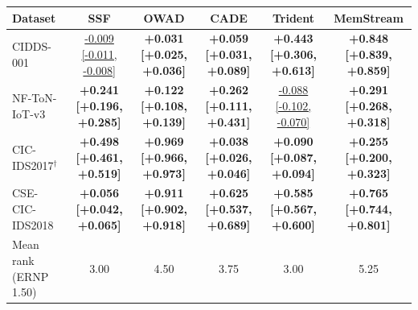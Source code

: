 \begin{tabular}{lccccc}
\toprule
Dataset & SSF & OWAD & CADE & Trident & MemStream\\
\midrule
CIDDS-001 & \underline{-0.009 [-0.011, -0.008]} & \textbf{+0.031 [+0.025, +0.036]} & \textbf{+0.059 [+0.031, +0.089]} & \textbf{+0.443 [+0.306, +0.613]} & \textbf{+0.848 [+0.839, +0.859]}\\
NF-ToN-IoT-v3 & \textbf{+0.241 [+0.196, +0.285]} & \textbf{+0.122 [+0.108, +0.139]} & \textbf{+0.262 [+0.111, +0.431]} & \underline{-0.088 [-0.102, -0.070]} & \textbf{+0.291 [+0.268, +0.318]}\\
CIC-IDS2017$^\dagger$ & \textbf{+0.498 [+0.461, +0.519]} & \textbf{+0.969 [+0.966, +0.973]} & \textbf{+0.038 [+0.026, +0.046]} & \textbf{+0.090 [+0.087, +0.094]} & \textbf{+0.255 [+0.200, +0.323]}\\
CSE-CIC-IDS2018 & \textbf{+0.056 [+0.042, +0.065]} & \textbf{+0.911 [+0.902, +0.918]} & \textbf{+0.625 [+0.537, +0.689]} & \textbf{+0.585 [+0.567, +0.600]} & \textbf{+0.765 [+0.744, +0.801]}\\
\midrule
Mean rank (ERNP 1.50) & 3.00 & 4.50 & 3.75 & 3.00 & 5.25\\
\bottomrule
\end{tabular}
